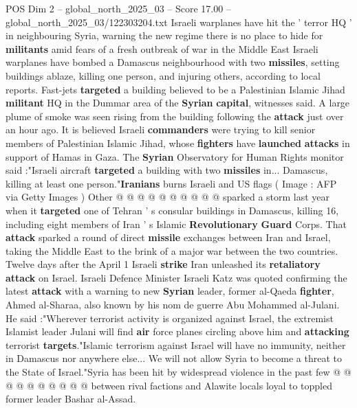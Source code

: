 \begin{textsample}{POS Dim 2 – global\_north\_2025\_03 – Score 17.00 – global\_north\_2025\_03/122303204.txt}  \label{ex:f2_pos_418}
Israeli warplanes have hit the ' terror HQ ' in neighbouring Syria, warning the new regime there is no place to hide for \textbf{militants} amid fears of a fresh outbreak of war in the Middle East Israeli warplanes have bombed a Damascus neighbourhood with two \textbf{missiles}, setting buildings ablaze, killing one person, and injuring others, according to local reports.
Fast-jets \textbf{targeted} a building believed to be a Palestinian Islamic Jihad \textbf{militant} HQ in the Dummar area of the \textbf{Syrian} \textbf{capital}, witnesses said.
A large plume of smoke was seen rising from the building following the \textbf{attack} just over an hour ago.
It is believed Israeli \textbf{commanders} were trying to kill senior members of Palestinian Islamic Jihad, whose \textbf{fighters} have \textbf{launched} \textbf{attacks} in support of Hamas in Gaza.
The \textbf{Syrian} Observatory for Human Rights monitor said :"Israeli aircraft \textbf{targeted} a building with two \textbf{missiles} in...
Damascus, killing at least one person."\textbf{Iranians} burns Israeli and US flags ( Image : AFP via Getty Images ) Other @ @ @ @ @ @ @ @ @ @ sparked a storm last year when it \textbf{targeted} one of Tehran ' s consular buildings in Damascus, killing 16, including eight members of Iran ' s Islamic \textbf{Revolutionary} \textbf{Guard} Corps.
That \textbf{attack} sparked a round of direct \textbf{missile} exchanges between Iran and Israel, taking the Middle East to the brink of a major war between the two countries.
Twelve days after the April 1 Israeli \textbf{strike} Iran unleashed its \textbf{retaliatory} \textbf{attack} on Israel.
Israeli Defence Minister Israeli Katz was quoted confirming the latest \textbf{attack} with a warning to new \textbf{Syrian} leader, former al-Qaeda \textbf{fighter}, Ahmed al-Sharaa, also known by his nom de guerre Abu Mohammed al-Julani.
He said :"Wherever terrorist activity is organized against Israel, the extremist Islamist leader Julani will find \textbf{air} force planes circling above him and \textbf{attacking} terrorist \textbf{targets}."Islamic terrorism against Israel will have no immunity, neither in Damascus nor anywhere else...
We will not allow Syria to become a threat to the State of Israel."Syria has been hit by widespread violence in the past few @ @ @ @ @ @ @ @ @ @ between rival factions and Alawite locals loyal to toppled former leader Bashar al-Assad.

\end{textsample}
